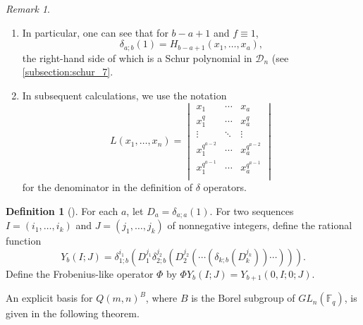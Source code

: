 \documentclass[12pt,a4paper]{report}
\theoremstyle{definition}
\newtheorem{definition}[theorem]{Definition}
\theoremstyle{remark}
\newtheorem*{remark}{Remark}
\theoremstyle{definition}
\begin{document}
\begin{remark}
    \begin{enumerate}
        \item In particular, one can see that for $b-a+1$ and $f\equiv 1$, 
\begin{equation*}
    \delta_{a;b}(1)=H_{b-a+1}(x_1, \ldots, x_a),
\end{equation*}
the right-hand side of which is a Schur polynomial in $\mathcal{D}_n$ (see \cref{subsection:schur_7}.
\item In subsequent calculations, we use the notation
\begin{equation*}
    L(x_1, \ldots, x_n) =\begin{vmatrix}
            x_1 & \cdots & x_a\\
            x_1^q & \cdots & x_a^q\\
            \vdots & \ddots & \vdots\\
            x_1^{q^{a-2}} & \cdots  & x_a^{q^{a-2}}\\
            x_1^{q^{a-1}} & \cdots  & x_a^{q^{a-1}}\\
        \end{vmatrix} 
\end{equation*}
for the denominator in the definition of $\delta$ operators.
\end{enumerate}
\end{remark}
\begin{definition}[{\cite[Definitions 1.3]{Ha_Hai_Nghia_2024}}]
    For each $a$, let $D_a = \delta_{a;a}(1)$. For two sequences $I = (i_1, \ldots, i_k)$ and $J = (j_1, \ldots, j_k)$ of nonnegative integers, define the rational function
    \begin{equation*}
        Y_b(I;J) = \delta_{1;b}^{i_1}(D_1^{j_1}\delta_{2;b}^{j_2}(D_2^{j_2}(\cdots(\delta_{k;b}(D_k^{j_k}))\cdots))).
    \end{equation*}
    Define the Frobenius-like operator $\Phi$ by $\Phi Y_b(I; J) = Y_{b+1}(0, I; 0; J)$.
\end{definition}
An explicit basis for $Q(m, n)^B$, where $B$ is the Borel subgroup of $GL_n(\mathbb{F}_q)$, is given in the following theorem.
\end{document}
